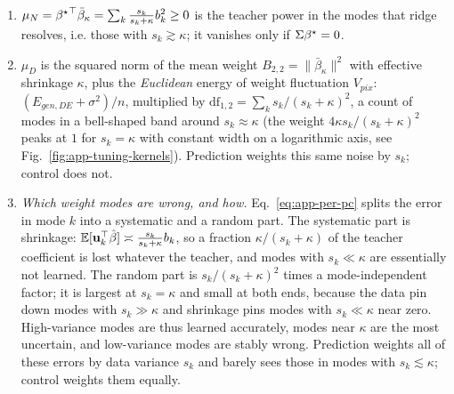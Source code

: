 \begin{remark}
\leavevmode
\begin{enumerate}
\item $\mu_N={\beta^{\star}}^\top\bar\beta_\kappa=\sum_k\frac{s_k}{s_k+\kappa}b_k^2\ge0$ is the teacher power in
the modes that ridge resolves, i.e. those with $s_k\gtrsim\kappa$; it
vanishes only if $\Sigma{\beta^{\star}}=0$.
\item $\mu_D$ is the squared norm of the mean weight $B_{2,2}=\|\bar\beta_\kappa\|^2$ with effective shrinkage $\kappa$, plus
the \emph{Euclidean} energy of weight fluctuation $V_{pix}$: 
$(E_{gen,DE}+\sigma^2)/n$, multiplied by $\mathrm{df}_{1,2}=\sum_ks_k/(s_k+\kappa)^2$,
a count of modes in a bell-shaped band around $s_k\approx\kappa$ (the weight
$4\kappa s_k/(s_k+\kappa)^2$ peaks at $1$ for $s_k=\kappa$ with constant
width on a logarithmic axis, see Fig.~\ref{fig:app-tuning-kernels}).  
Prediction weights this same noise by $s_k$; control does not.
\item {\emph{Which weight modes are wrong, and how.}  Eq.~\ref{eq:app-per-pc}
splits the error in mode $k$ into a systematic and a random part.  The
systematic part is shrinkage: $\mathbb{E}[{\mathbf{u}}_k^\top\hat{\beta}]\asymp
\frac{s_k}{s_k+\kappa}b_k$, so a fraction $\kappa/(s_k+\kappa)$ of the
teacher coefficient is lost whatever the teacher, and modes with
$s_k\ll\kappa$ are essentially not learned.  The random part is
$s_k/(s_k+\kappa)^2$ times a mode-independent factor; it is largest at
$s_k=\kappa$ and small at both ends, because the data pin down modes with
$s_k\gg\kappa$ and shrinkage pins modes with $s_k\ll\kappa$ near zero.
High-variance modes are thus learned accurately, modes near $\kappa$ are the
most uncertain, and low-variance modes are stably wrong.  Prediction weights
all of these errors by data variance $s_k$ and barely sees those in modes with
$s_k\lesssim\kappa$; control weights them equally.}
\end{enumerate}
\end{remark}

